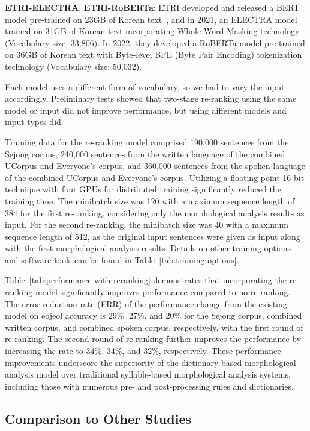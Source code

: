 \documentclass[AMS,STIX2COL]{WileyNJD-v2}
\begin{document}
    \textbf{ETRI-ELECTRA}, \textbf{ETRI-RoBERTa}: ETRI developed and released a BERT model pre-trained on 23GB of Korean text~\cite{KorBERT}, and in 2021, an ELECTRA model trained on 31GB of Korean text incorporating Whole Word Masking technology (Vocabulary size: 33,806).
    In 2022, they developed a RoBERTa model pre-trained on 36GB of Korean text with Byte-level BPE (Byte Pair Encoding) tokenization technology (Vocabulary size: 50,032).

    Each model uses a different form of vocabulary, so we had to vary the input accordingly.
    Preliminary tests showed that two-stage re-ranking using the same model or input did not improve performance, but using different models and input types did.

    Training data for the re-ranking model comprised 190,000 sentences from the Sejong corpus, 240,000 sentences from the written language of the combined UCorpus and Everyone's corpus, and 360,000 sentences from the spoken language of the combined UCorpus and Everyone's corpus.
    Utilizing a floating-point 16-bit technique with four GPUs for distributed training significantly reduced the training time.
    The minibatch size was 120 with a maximum sequence length of 384 for the first re-ranking, considering only the morphological analysis results as input.
    For the second re-ranking, the minibatch size was 40 with a maximum sequence length of 512, as the original input sentences were given as input along with the first morphological analysis results.
    Details on other training options and software tools can be found in Table~\ref{tab:training-options}.

    Table~\ref{tab:performance-with-reranking} demonstrates that incorporating the re-ranking model significantly improves performance compared to no re-ranking.
    The error reduction rate (ERR) of the performance change from the existing model on eojeol accuracy is 29\%, 27\%, and 20\% for the Sejong corpus, combined written corpus, and combined spoken corpus, respectively, with the first round of re-ranking.
    The second round of re-ranking further improves the performance by increasing the rate to 34\%, 34\%, and 32\%, respectively.
    These performance improvements underscore the superiority of the dictionary-based morphological analysis model over traditional syllable-based morphological analysis systems, including those with numerous pre- and post-processing rules and dictionaries.

    \subsection{Comparison to Other Studies}\label{subsec:comparison-to-other-studies}
\end{document}
